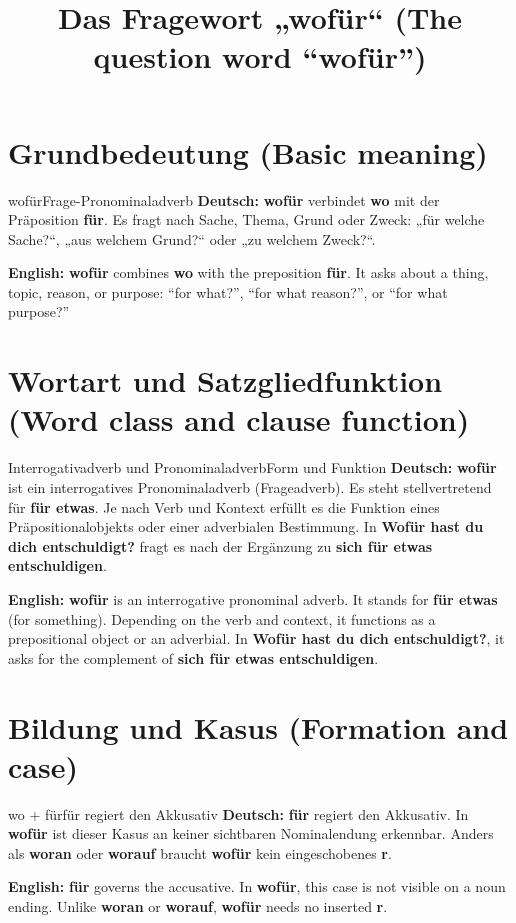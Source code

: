 \documentclass[a4paper,11pt]{article}
\title{Das Fragewort „wofür“ (The question word “wofür”)}
\date{}
\newcommand{\GermanText}[1]{\textbf{Deutsch: }#1\par}
\newcommand{\EnglishText}[1]{{\small\color{SoftGray}\textbf{English: }#1\par}}
\begin{document}
\maketitle
\tableofcontents
\newpage
\section{Grundbedeutung (Basic meaning)}
\begin{grammarentry}{wofür}{Frage-Pronominaladverb}
\GermanText{\textbf{wofür} verbindet \textbf{wo} mit der Präposition \textbf{für}. Es fragt nach Sache, Thema, Grund oder Zweck: „für welche Sache?“, „aus welchem Grund?“ oder „zu welchem Zweck?“.}
\EnglishText{\textbf{wofür} combines \textbf{wo} with the preposition \textbf{für}. It asks about a thing, topic, reason, or purpose: “for what?”, “for what reason?”, or “for what purpose?”}
\end{grammarentry}

\section{Wortart und Satzgliedfunktion (Word class and clause function)}
\begin{grammarentry}{Interrogativadverb und Pronominaladverb}{Form und Funktion}
\GermanText{\textbf{wofür} ist ein interrogatives Pronominaladverb (Frageadverb). Es steht stellvertretend für \textbf{für etwas}. Je nach Verb und Kontext erfüllt es die Funktion eines Präpositionalobjekts oder einer adverbialen Bestimmung. In \textbf{Wofür hast du dich entschuldigt?} fragt es nach der Ergänzung zu \textbf{sich für etwas entschuldigen}.}
\EnglishText{\textbf{wofür} is an interrogative pronominal adverb. It stands for \textbf{für etwas} (for something). Depending on the verb and context, it functions as a prepositional object or an adverbial. In \textbf{Wofür hast du dich entschuldigt?}, it asks for the complement of \textbf{sich für etwas entschuldigen}.}
\end{grammarentry}

\section{Bildung und Kasus (Formation and case)}
\begin{grammarentry}{wo + für}{für regiert den Akkusativ}
\GermanText{\textbf{für} regiert den Akkusativ. In \textbf{wofür} ist dieser Kasus an keiner sichtbaren Nominalendung erkennbar. Anders als \textbf{woran} oder \textbf{worauf} braucht \textbf{wofür} kein eingeschobenes \textbf{r}.}
\EnglishText{\textbf{für} governs the accusative. In \textbf{wofür}, this case is not visible on a noun ending. Unlike \textbf{woran} or \textbf{worauf}, \textbf{wofür} needs no inserted \textbf{r}.}
\end{grammarentry}
\end{document}
